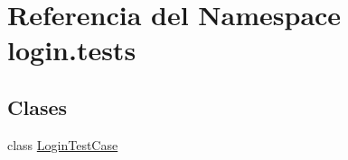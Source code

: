 \hypertarget{namespacelogin_1_1tests}{}\section{Referencia del Namespace login.\+tests}
\label{namespacelogin_1_1tests}
\subsection*{Clases}
\begin{DoxyCompactItemize}
\item 
class \hyperlink{classlogin_1_1tests_1_1_login_test_case}{Login\+Test\+Case}
\end{DoxyCompactItemize}
